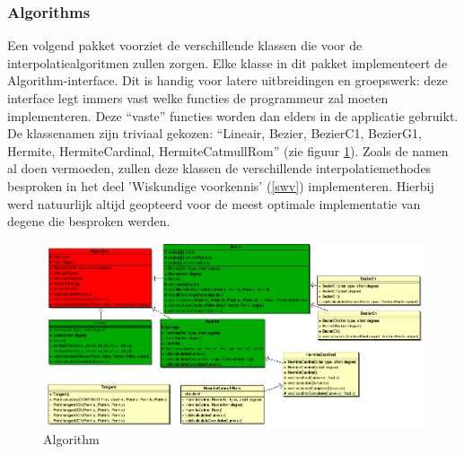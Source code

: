 \documentclass[a4paper,11pt,oneside, titlepage]{article}
\begin{document}
\subsubsection{Algorithms}
Een volgend pakket voorziet de verschillende klassen die voor de interpolatiealgoritmen zullen zorgen.
Elke klasse in dit pakket implementeert de Algorithm-interface. Dit is handig voor latere uitbreidingen en groepswerk: deze interface 
legt immers vast welke functies de programmeur zal moeten implementeren. Deze ``vaste'' functies worden dan elders in de applicatie gebruikt. \newline
De klassenamen zijn triviaal gekozen: ``Lineair, Bezier, BezierC1, BezierG1, Hermite, 
HermiteCardinal, HermiteCatmullRom'' (zie figuur \ref{iAlg}).
Zoals de namen al doen vermoeden, zullen deze klassen de verschillende
interpolatiemethodes besproken in het deel 'Wiskundige voorkennis' (\ref{swv}) implementeren.
Hierbij werd natuurlijk altijd geopteerd voor de meest optimale implementatie van degene die 
besproken werden.
\begin{figure}[htbp]
\centering
\includegraphics[scale=0.45]{./UML2/Alg.png}
\caption{Algorithm}\label{iAlg}
\end{figure}
\end{document}
